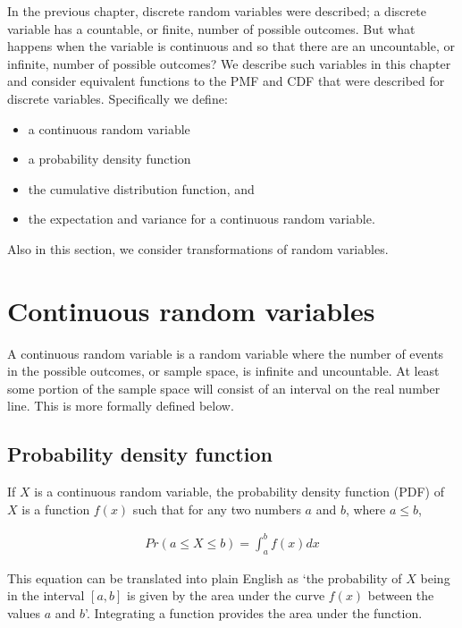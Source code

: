 \documentclass[
  oneside]{krantz}
\begin{document}
In the previous chapter, discrete random variables were described; a discrete variable has a countable, or finite, number of possible outcomes. But what happens when the variable is continuous and so that there are an uncountable, or infinite, number of possible outcomes? We describe such variables in this chapter and consider equivalent functions to the PMF and CDF that were described for discrete variables. Specifically we define:

\begin{itemize}
\item
  a continuous random variable
\item
  a probability density function
\item
  the cumulative distribution function, and
\item
  the expectation and variance for a continuous random variable.
\end{itemize}

Also in this section, we consider transformations of random variables.

\hypertarget{continuous-random-variables}{%
\section{Continuous random variables}\label{continuous-random-variables}}

A continuous random variable is a random variable where the number of events in the possible outcomes, or sample space, is infinite and uncountable. At least some portion of the sample space will consist of an interval on the real number line. This is more formally defined below.

\hypertarget{probability-density-function}{%
\subsection{Probability density function}\label{probability-density-function}}

If \(X\) is a continuous random variable, the probability density function (PDF) of \(X\) is a function \(f(x)\) such that for any two numbers \(a\) and \(b\), where \(a \leq b\),

\begin{align}
Pr(a \le X \le b) = \int_a^b f(x)dx
\end{align}

This equation can be translated into plain English as `the probability of \(X\) being in the interval \([a, b]\) is given by the area under the curve \(f(x)\) between the values \(a\) and \(b\)'. Integrating a function provides the area under the function.
\end{document}
